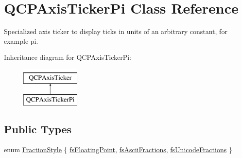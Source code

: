 \hypertarget{class_q_c_p_axis_ticker_pi}{}\section{Q\+C\+P\+Axis\+Ticker\+Pi Class Reference}
\label{class_q_c_p_axis_ticker_pi}


Specialized axis ticker to display ticks in units of an arbitrary constant, for example pi.  


Inheritance diagram for Q\+C\+P\+Axis\+Ticker\+Pi\+:\begin{figure}[H]
\begin{center}
\leavevmode
\includegraphics[height=2.000000cm]{class_q_c_p_axis_ticker_pi}
\end{center}
\end{figure}
\subsection*{Public Types}
\begin{DoxyCompactItemize}
\item 
enum \hyperlink{class_q_c_p_axis_ticker_pi_a262f1534c7f0c79a7d5237f5d1e2c54c}{Fraction\+Style} \{ \hyperlink{class_q_c_p_axis_ticker_pi_a262f1534c7f0c79a7d5237f5d1e2c54ca00f097b669b2a0e22f508f1ae97877d8}{fs\+Floating\+Point}, 
\hyperlink{class_q_c_p_axis_ticker_pi_a262f1534c7f0c79a7d5237f5d1e2c54ca05a5457e0e14cb726f623e25282066b3}{fs\+Ascii\+Fractions}, 
\hyperlink{class_q_c_p_axis_ticker_pi_a262f1534c7f0c79a7d5237f5d1e2c54ca92f38a938c8b179b23363d9993681c55}{fs\+Unicode\+Fractions}
 \}
\end{DoxyCompactItemize}
